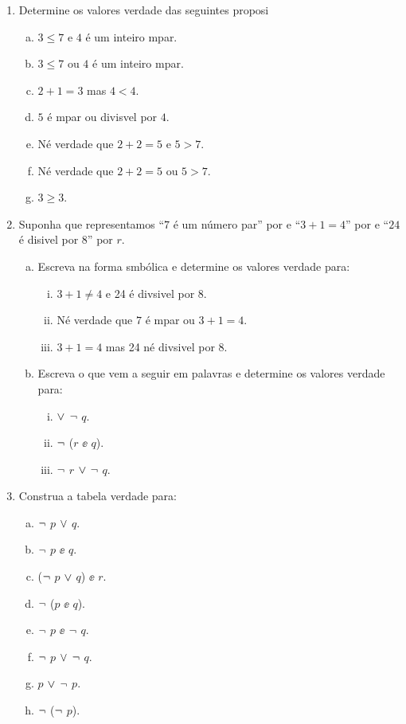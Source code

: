 \begin{enumerate}[{\bf 1.}]
\item Determine os valores verdade das seguintes proposi\coes 
\begin{enumerate}[a)]
\item $3\leq7$ e $4$ \'e um inteiro \ih mpar. 
\item $3\leq7$ ou $4$ \'e um inteiro \ih mpar. 
\item $2+1=3$ mas $4<4$.
\item $5$ \'e \ih mpar ou divis\ih vel por $4$.
\item N\ao \'e verdade que $2+2=5$ e $5>7$.
\item N\ao \'e verdade que $2+2=5$ ou $5>7$.
\item $3 \geq 3$.
\end{enumerate}

\item Suponha que representamos ``$7$ \'e um n\'umero par'' por \pp e ``$3+1=4$'' por \qq e ``$24$ \'e di\ih sivel por $8$'' por $r$. 
\begin{enumerate}[a)]
\item Escreva na forma s\ih mb\'olica e determine os valores verdade para:
\begin{enumerate}[i)]
\item $3+1 \neq 4$ e 24 \'e div\ih sivel por 8.
\item N\ao \'e verdade que $7$ \'e \ih mpar ou $3+1=4$.
\item $3+1=4$ mas 24 n\ao \'e div\ih sivel por 8.
\end{enumerate}

\item Escreva o que vem a seguir em palavras e determine os valores verdade para:
\begin{enumerate}[i)]
\item \pp $\vee$ $\lnot$ $q$.
\item $\lnot$ ($r$ $\ee$ $q$).
\item $\lnot$ $r$ $\vee$ $\lnot$ $q$.
\end{enumerate}
\end{enumerate}

\item Construa a tabela verdade para:
\begin{enumerate}[a)]
\item $\lnot$ $p$ $\vee$ $q$.
\item $\lnot$ $p$ $\ee$ $q$.
\item ($\lnot$ $p$ $\vee$ $q$) $\ee$ $r$.
\item\label{eou3d} $\lnot$ ($p$ $\ee$ $q$).
\item $\lnot$ $p$ $\ee$ $\lnot$ $q$.
\item\label{eou3f}$\lnot$ $p$ $\vee$ $\lnot$ $q$.
\item\label{eou3g}$p$ $\vee$ $\lnot$ $p$.
\item $\lnot$ ($\lnot$ $p$).
\end{enumerate}



\end{enumerate}
